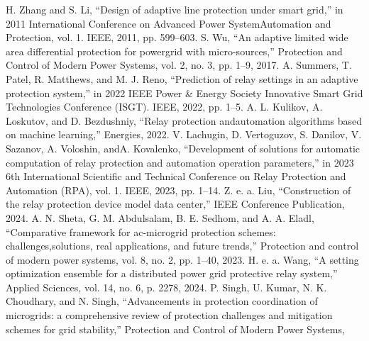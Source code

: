 
H. Zhang and S. Li, “Design of adaptive line protection under smart grid,” in 2011
International Conference on Advanced Power SystemAutomation and Protection, vol. 1. IEEE,
2011, pp. 599–603.
S. Wu, “An adaptive limited wide area differential protection for powergrid with
micro-sources,” Protection and Control of Modern Power Systems, vol. 2, no. 3, pp. 1–9,
2017.
A. Summers, T. Patel, R. Matthews, and M. J. Reno, “Prediction of relay settings in an
adaptive protection system,” in 2022 IEEE Power \& Energy Society Innovative Smart Grid
Technologies Conference (ISGT). IEEE, 2022, pp. 1–5.
A. L. Kulikov, A. Loskutov, and D. Bezdushniy, “Relay protection andautomation algorithms
based on machine learning,” Energies, 2022.
V. Lachugin, D. Vertoguzov, S. Danilov, V. Sazanov, A. Voloshin, andA. Kovalenko,
“Development of solutions for automatic computation of relay protection and automation
operation parameters,” in 2023 6th International Scientific and Technical Conference on
Relay Protection and Automation (RPA), vol. 1. IEEE, 2023, pp. 1–14.
Z. e. a. Liu, “Construction of the relay protection device model data center,” IEEE
Conference Publication, 2024.
A. N. Sheta, G. M. Abdulsalam, B. E. Sedhom, and A. A. Eladl, “Comparative framework for
ac-microgrid protection schemes: challenges,solutions, real applications, and future
trends,” Protection and control of modern power systems, vol. 8, no. 2, pp. 1–40, 2023.
H. e. a. Wang, “A setting optimization ensemble for a distributed power grid protective
relay system,” Applied Sciences, vol. 14, no. 6, p. 2278, 2024.
P. Singh, U. Kumar, N. K. Choudhary, and N. Singh, “Advancements in protection
coordination of microgrids: a comprehensive review of protection  challenges and
mitigation schemes for grid stability,” Protection and Control of Modern Power Systems,
